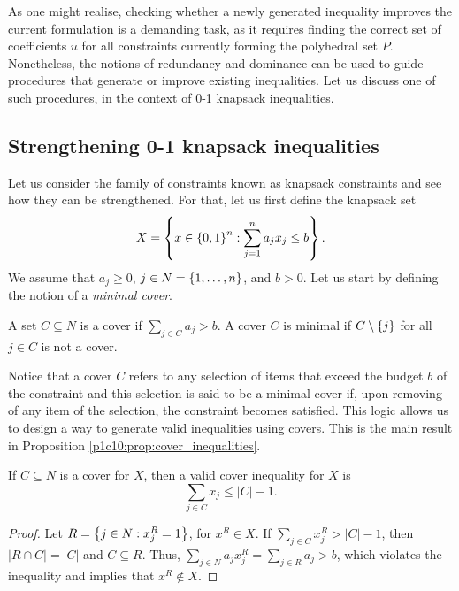 As one might realise, checking whether a newly generated inequality improves the current formulation is a demanding task, as it requires finding the correct set of coefficients $u$ for all constraints currently forming the polyhedral set $P$. Nonetheless, the notions of redundancy and dominance can be used to guide procedures that generate or improve existing inequalities. Let us discuss one of such procedures, in the context of 0-1 knapsack inequalities.


\subsection{Strengthening 0-1 knapsack inequalities}

Let us consider the family of constraints known as knapsack constraints and see how they can be strengthened. For that, let us first define the knapsack set
%
\begin{equation*}
	X = \left\{ x \in \left\{ 0,1 \right \}^n : \sum_{j=1}^n a_jx_j \leq b \right \}.	
\end{equation*}
%
We assume that $a_j \geq 0$, $j \in N = \left\{ 1, \dots, n \right \}$, and $b > 0$. Let us start by defining the notion of a \emph{minimal cover}.

\begin{definition}  \label{p1c10:def:minimal_cover}
	A set $C \subseteq N$ is a cover if $\sum_{j \in C} a_j > b$. A cover $C$ is minimal if $C \setminus \left\{ j \right \}$ for all $j \in C$ is not a cover.  
\end{definition} 

Notice that a cover $C$ refers to any selection of items that exceed the budget $b$ of the constraint and this selection is said to be a minimal cover if, upon removing of any item of the selection, the constraint becomes satisfied. This logic allows us to design a way to generate valid inequalities using covers. This is the main result in Proposition \ref{p1c10:prop:cover_inequalities}.

\begin{proposition} \label{p1c10:prop:cover_inequalities}
	If $C \subseteq N$ is a cover for $X$, then a valid cover inequality for $X$ is
	\begin{equation*}
		\sum_{j \in C} x_j \leq |C|-1.		
	\end{equation*}
\end{proposition}

\begin{proof} 
	Let $R = \left\{ j \in N : x^R_j = 1 \right \}$, for $x^R \in X$. If $\sum_{j \in C}x_j^R > |C|-1$, then $|R \cap C| = |C|$ and $C \subseteq R$. Thus, $\sum_{j\in N}a_j x_j^R = \sum_{j\in R}a_j > b$, which violates the inequality and implies that $x^R \notin X$.  
\end{proof}

